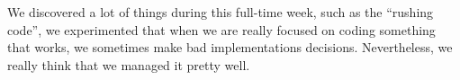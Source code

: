  
 
We discovered a lot of things during this full-time week, such as the “rushing code”, we experimented that when we are really focused on coding something that works, we sometimes make bad implementations decisions. Nevertheless, we really think that we managed it pretty well.
